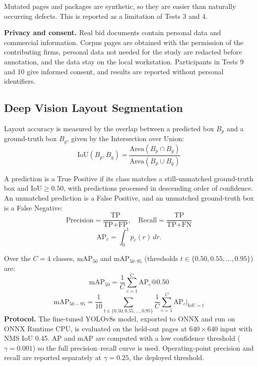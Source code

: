 Mutated pages and packages are synthetic, so they are easier than naturally occurring defects. This is reported as a limitation of Tests 3 and 4.

\textbf{Privacy and consent.} Real bid documents contain personal data and commercial information. Corpus pages are obtained with the permission of the contributing firms, personal data not needed for the study are redacted before annotation, and the data stay on the local workstation. Participants in Tests 9 and 10 give informed consent, and results are reported without personal identifiers.

\subsection{Deep Vision Layout Segmentation}
\label{sec:eval_layout_segmentation}

Layout accuracy is measured by the overlap between a predicted box $B_p$ and a ground-truth box $B_g$, given by the Intersection over Union:
\begin{equation}
\label{eq:iou_overlap}
\text{IoU}(B_p, B_g) = \frac{\text{Area}(B_p \cap B_g)}{\text{Area}(B_p \cup B_g)}
\end{equation}

A prediction is a True Positive if its class matches a still-unmatched ground-truth box and $\text{IoU} \ge 0.50$, with predictions processed in descending order of confidence.
An unmatched prediction is a False Positive, and an unmatched ground-truth box is a False Negative:
\begin{equation}
\label{eq:precision_recall_metrics}
\text{Precision} = \frac{\text{TP}}{\text{TP} + \text{FP}}, \quad \text{Recall} = \frac{\text{TP}}{\text{TP} + \text{FN}}
\end{equation}
\begin{equation}
\label{eq:average_precision}
\mathrm{AP}_c=\int_0^1 p_c(r)\,dr.
\end{equation}

Over the $C=4$ classes, $\mathrm{mAP}_{50}$ and $\mathrm{mAP}_{50\text{--}95}$ (thresholds $t\in\{0.50,0.55,\ldots,0.95\}$) are:
\begin{equation}
\label{eq:map50_metric}
\text{mAP}_{50} = \frac{1}{C} \sum_{c=1}^C \text{AP}_c @ 0.50
\end{equation}
\begin{equation}
\label{eq:map50_95_metric}
\text{mAP}_{50-95} = \frac{1}{10} \sum_{t \in \{0.50, 0.55, \dots, 0.95\}} \frac{1}{C} \sum_{c=1}^C \text{AP}_c |_{\text{IoU} = t}
\end{equation}
\textbf{Protocol.} The fine-tuned YOLOv8s model, exported to ONNX and run on ONNX Runtime CPU, is evaluated on the held-out pages at $640\times640$ input with NMS IoU 0.45. AP and mAP are computed with a low confidence threshold ($\gamma=0.001$) so the full precision--recall curve is used. Operating-point precision and recall are reported separately at $\gamma=0.25$, the deployed threshold.


